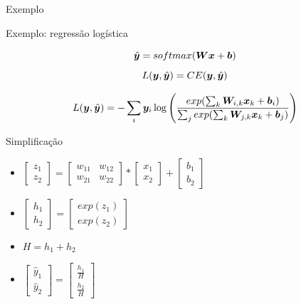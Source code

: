 \documentclass[10pt]{beamer}
\begin{document}
\begin{frame}{Exemplo}

\end{frame}

\begin{frame}{Exemplo: regressão logística}
\Large{
\begin{equation*}
\hat{\bm{y}} = softmax(\bm{W}\bm{x} + \bm{b})
\end{equation*}
\begin{equation*}
L(\bm{y},\hat{\bm{y}}) = CE(\bm{y},\hat{\bm{y}})
\end{equation*}


\begin{equation*}
L(\bm{y},\hat{\bm{y}}) = - \sum_{i}\bm{y}_{i} \log \left(\frac{exp(\sum_{k} \bm{W}_{i,k}\bm{x}_{k} + \bm{b}_{i})}{\sum_{j}exp(\sum_{k}\bm{W}_{j,k}\bm{x}_{k} + \bm{b}_{j})} \right)
\end{equation*}
}
\end{frame}

\begin{frame}{Simplificação}
\Large{
\begin{itemize}
\item $\begin{bmatrix}z_1\\z_2\end{bmatrix} = \begin{bmatrix}w_{11}  & w_{12}\\w_{21}  & w_{22}\end{bmatrix}* \begin{bmatrix}x_1\\x_2\end{bmatrix} + \begin{bmatrix}b_1\\b_2\end{bmatrix}$

\vspace{0.4cm}

\item $\begin{bmatrix}h_1\\h_2\end{bmatrix} = \begin{bmatrix}exp(z_1)\\exp(z_2)\end{bmatrix}$ 

\vspace{0.4cm}

\item $H = h_1 + h_2$ 

\vspace{0.4cm}

\item $\begin{bmatrix}\hat{y}_1\\\hat{y}_2\end{bmatrix} = \begin{bmatrix}\frac{h_1}{H}\\\frac{h_2}{H}\end{bmatrix}$ 
\end{itemize}
}
\end{frame}
\end{document}
